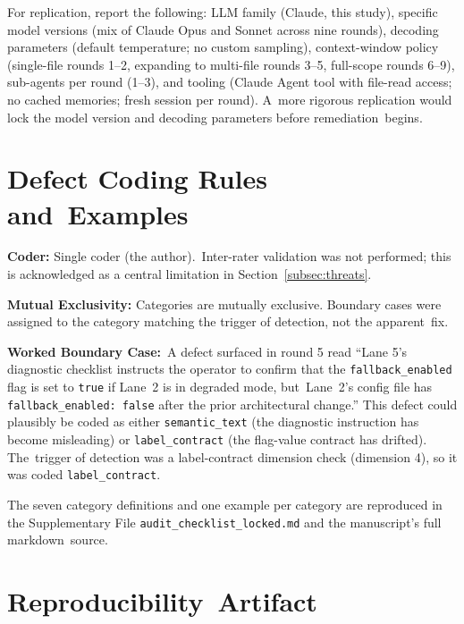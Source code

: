 \documentclass[software,article,accept,pdftex,oneauthor]{Definitions/mdpi}
\def\hl#1{#1}
\begin{document}
For replication, report the following: LLM family (Claude, this study), specific model versions (mix of Claude Opus and Sonnet across nine rounds), decoding parameters (default temperature; no custom sampling), context-window policy (single-file rounds 1--2, expanding to multi-file rounds 3--5, full-scope rounds 6--9), sub-agents per round (1--3), and tooling (Claude Agent tool with file-read access; no cached memories; fresh session per round). A~more rigorous replication would lock the model version and decoding parameters before remediation~begins.

\section{Defect Coding Rules and~Examples}
\label{appendix:b}

\textbf{\hl{Coder:}%
} Single coder (the author).~Inter-rater validation was not performed; this is acknowledged as a central limitation in Section~\ref{subsec:threats}.

\textbf{\hl{Mutual Exclusivity:}} Categories are mutually exclusive. Boundary cases were assigned to the category matching the trigger of detection, not the apparent~fix.

\textbf{Worked Boundary Case:}~A defect surfaced in round 5 read ``Lane 5's diagnostic checklist instructs the operator to confirm that the \texttt{fallback\_enabled} flag is set to \texttt{true} if Lane~2 is in degraded mode, but~Lane~2's config file has \texttt{fallback\_enabled: false} after the prior architectural change.'' This defect could plausibly be coded as either \texttt{semantic\_text} (the diagnostic instruction has become misleading) or \texttt{label\_contract} (the flag-value contract has drifted). The~trigger of detection was a label-contract dimension check (dimension 4), so it was coded \texttt{label\_contract}.

The seven category definitions and one example per category are reproduced in the Supplementary File \texttt{audit\_checklist\_locked.md} and the manuscript's full markdown~source.

\section{Reproducibility~Artifact}
\label{appendix:c}
\end{document}
